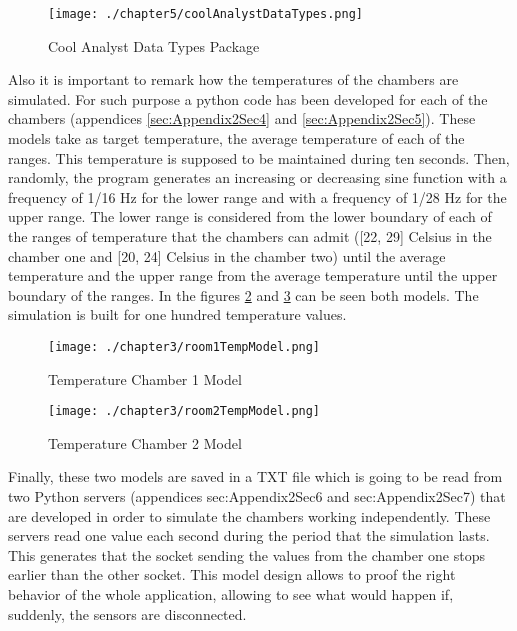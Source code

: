 \begin{figure}
\centering
{\texttt{[image: ./chapter5/coolAnalystDataTypes.png]}}
\caption{Cool Analyst Data Types Package}
\label{fig:Cool Analyst Data Types Package}
\end{figure}

Also it is important to remark how the temperatures of the chambers are simulated. For such purpose a python code has been developed for each of the chambers (appendices \ref{sec:Appendix2Sec4} and \ref{sec:Appendix2Sec5}). These models take as target temperature, the average temperature of each of the ranges. This temperature is supposed to be maintained during ten seconds. Then, randomly, the program generates an increasing or decreasing sine function with a frequency of 1/16 Hz for the lower range and with a frequency of 1/28 Hz for the upper range. The lower range is considered from the lower boundary of each of the ranges of temperature that the chambers can admit ([22, 29] Celsius in the chamber one and [20, 24] Celsius in the chamber two) until the average temperature and the upper range from the average temperature until the upper boundary of the ranges. In the figures \ref{fig:Temperature Chamber 1 Model} and \ref{fig:Temperature Chamber 2 Model} can be seen both models. The simulation is built for one hundred temperature values.

\begin{figure}
\centering
{\texttt{[image: ./chapter3/room1TempModel.png]}}
\caption{Temperature Chamber 1 Model}
\label{fig:Temperature Chamber 1 Model}
\end{figure}

\begin{figure}
\centering
{\texttt{[image: ./chapter3/room2TempModel.png]}}
\caption{Temperature Chamber 2 Model}
\label{fig:Temperature Chamber 2 Model}
\end{figure}

Finally, these two models are saved in a TXT file which is going to be read from two Python servers (appendices {sec:Appendix2Sec6} and {sec:Appendix2Sec7}) that are developed in order to simulate the chambers working independently. These servers read one value each second during the period that the simulation lasts. This generates that the socket sending the values from the chamber one stops earlier than the other socket. This model design allows to proof the right behavior of the whole application, allowing to see what would happen if, suddenly, the sensors are disconnected.


